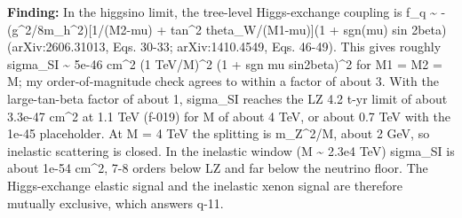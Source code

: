 \documentclass[11pt,a4paper]{article}
\begin{document}
\textbf{Finding:} In the higgsino limit, the tree-level Higgs-exchange coupling is f\_q \textasciitilde{} -(g\textasciicircum{}2/8m\_h\textasciicircum{}2)[1/(M2-\textbar{}mu\textbar{}) + tan\textasciicircum{}2 theta\_W/(M1-\textbar{}mu\textbar{})](1 + sgn(mu) sin 2beta) (arXiv:2606.31013, Eqs. 30-33; arXiv:1410.4549, Eqs. 46-49). This gives roughly sigma\_SI \textasciitilde{} 5e-46 cm\textasciicircum{}2 (1 TeV/M)\textasciicircum{}2 (1 + sgn mu sin2beta)\textasciicircum{}2 for M1 = M2 = M; my order-of-magnitude check agrees to within a factor of about 3. With the large-tan-beta factor of about 1, sigma\_SI reaches the LZ 4.2 t-yr limit of about 3.3e-47 cm\textasciicircum{}2 at 1.1 TeV (f-019) for M of about 4 TeV, or about 0.7 TeV with the 1e-45 placeholder. At M = 4 TeV the splitting is m\_Z\textasciicircum{}2/M, about 2 GeV, so inelastic scattering is closed. In the inelastic window (M \textasciitilde{} 2.3e4 TeV) sigma\_SI is about 1e-54 cm\textasciicircum{}2, 7-8 orders below LZ and far below the neutrino floor. The Higgs-exchange elastic signal and the inelastic xenon signal are therefore mutually exclusive, which answers q-11.
\end{document}
